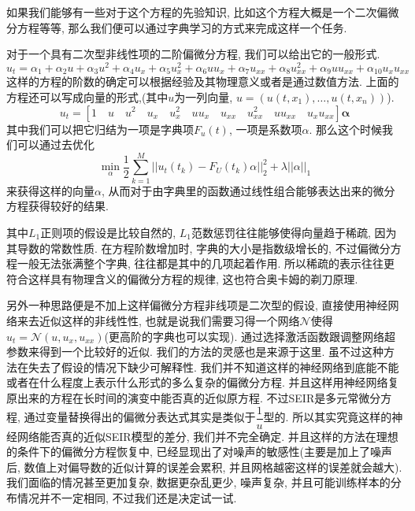 \documentclass[lang=cn,11pt]{elegantpaper}
\begin{document}
如果我们能够有一些对于这个方程的先验知识, 比如这个方程大概是一个二次偏微分方程等等, 那么我们便可以通过字典学习的方式来完成这样一个任务.

对于一个具有二次型非线性项的二阶偏微分方程, 我们可以给出它的一般形式.
\large
\begin{equation}
	u_t=\alpha_1+\alpha_2u+\alpha_3u^2+\alpha_4u_x+\alpha_5u_x^2+\alpha_6uu_x+\alpha_7u_{xx}+\alpha_8u_{xx}^2+\alpha_9uu_{xx}+\alpha_{10}u_xu_{xx}
\end{equation}
\normalsize
这样的方程的阶数的确定可以根据经验及其物理意义或者是通过数值方法. 上面的方程还可以写成向量的形式,(其中$u$为一列向量, $u=(u(t,x_1), \dots, u(t,x_n))$).
\large
\begin{equation}
	u_t=[1\quad u\quad u^2\quad u_x\quad u_x^2\quad uu_x\quad u_{xx}\quad u_{xx}^2\quad uu_{xx}\quad u_xu_{xx}] \mathbf \alpha
\end{equation}
\normalsize
其中我们可以把它归结为一项是字典项$F_u(t)$, 一项是系数项$\alpha$. 那么这个时候我们可以通过去优化
\large
\begin{equation}
	\min_\alpha \dfrac{1}{2}\sum_{k=1}^M ||u_t(t_k)-F_U(t_k)\alpha||_2^2+\lambda||\alpha||_1
\end{equation}
\normalsize
来获得这样的向量$\alpha$, 从而对于由字典里的函数通过线性组合能够表达出来的微分方程获得较好的结果. 

其中$L_1$正则项的假设是比较自然的, $L_1$范数惩罚往往能够使得向量趋于稀疏, 因为其导数的常数性质. 在方程阶数增加时, 字典的大小是指数级增长的, 不过偏微分方程一般无法张满整个字典, 往往都是其中的几项起着作用. 所以稀疏的表示往往更符合这样具有物理含义的偏微分方程的规律, 这也符合奥卡姆的剃刀原理\cite{Schaeffer2017}.

另外一种思路便是不加上这样偏微分方程非线项是二次型的假设, 直接使用神经网络来去近似这样的非线性性, 也就是说我们需要习得一个网络$\mathcal N$使得$u_t=\mathcal N(u,u_x,u_{xx})$(更高阶的字典也可以实现). 通过选择激活函数跟调整网络超参数来得到一个比较好的近似. 我们的方法的灵感也是来源于这里. 虽不过这种方法在失去了假设的情况下缺少可解释性. 我们并不知道这样的神经网络到底能不能或者在什么程度上表示什么形式的多么复杂的偏微分方程. 并且这样用神经网络复原出来的方程在长时间的演变中能否真的近似原方程. 不过SEIR是多元常微分方程, 通过变量替换得出的偏微分表达式其实是类似于$\dfrac{1}{u}$型的. 所以其实究竟这样的神经网络能否真的近似SEIR模型的差分, 我们并不完全确定. 并且这样的方法在理想的条件下的偏微分方程恢复中, 已经显现出了对噪声的敏感性(主要是加上了噪声后, 数值上对偏导数的近似计算的误差会累积\cite{long2019pde}, 并且网格越密这样的误差就会越大). 我们面临的情况甚至更加复杂, 数据更杂乱更少, 噪声复杂, 并且可能训练样本的分布情况并不一定相同, 不过我们还是决定试一试.
\end{document}
